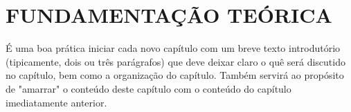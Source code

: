 
\chapter{FUNDAMENTAÇÃO TEÓRICA}
\label{chap:fundamentacaoTeorica}

É uma boa prática iniciar cada novo capítulo com um breve texto introdutório (tipicamente, dois ou três parágrafos) que deve deixar claro o quê será discutido no capítulo, bem como a organização do capítulo.
Também servirá ao propósito de "amarrar"{} o conteúdo deste capítulo com o conteúdo do capítulo imediatamente anterior.
